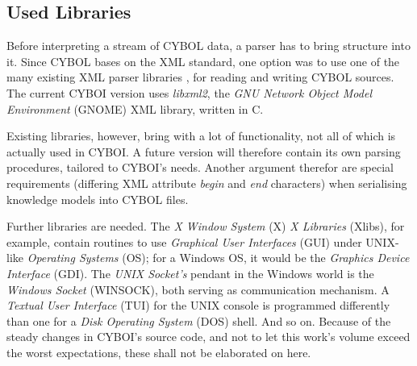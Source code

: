 %
%
%
%
%
%
%

\subsection{Used Libraries}
\label{used_libraries_heading}

Before interpreting a stream of CYBOL data, a parser has to bring structure
into it. Since CYBOL bases on the XML standard, one option was to use one of
the many existing XML parser libraries \cite{dom, sax}, for reading and writing
CYBOL sources. The current CYBOI version uses \emph{libxml2}, the
\emph{GNU Network Object Model Environment} (GNOME) XML library, written in C.

Existing libraries, however, bring with a lot of functionality, not all of
which is actually used in CYBOI. A future version will therefore contain its
own parsing procedures, tailored to CYBOI's needs. Another argument therefor
are special requirements (differing XML attribute \emph{begin} and \emph{end}
characters) when serialising knowledge models into CYBOL files.

Further libraries are needed. The \emph{X Window System} (X) \emph{X Libraries}
(Xlibs), for example, contain routines to use \emph{Graphical User Interfaces}
(GUI) under UNIX-like \emph{Operating Systems} (OS); for a Windows OS, it would
be the \emph{Graphics Device Interface} (GDI). The \emph{UNIX Socket's} pendant
in the Windows world is the \emph{Windows Socket} (WINSOCK), both serving as
communication mechanism. A \emph{Textual User Interface} (TUI) for the UNIX
console is programmed differently than one for a \emph{Disk Operating System}
(DOS) shell. And so on. Because of the steady changes in CYBOI's source code,
and not to let this work's volume exceed the worst expectations, these shall
not be elaborated on here.

